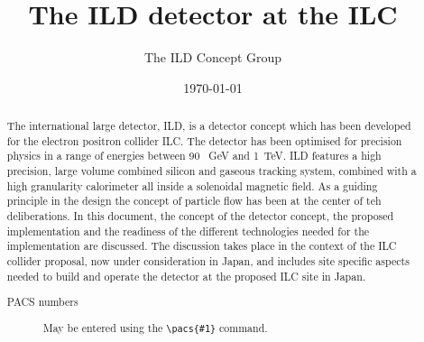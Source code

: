 \documentclass[%
 amsmath,amssymb,
 aps,
]{revtex4-1}
\begin{document}


\title{The ILD detector at the ILC}%

\author{The ILD Concept Group}




\date{\today}%

\begin{abstract}
The international large detector, ILD, is a detector concept which has been developed for the electron positron collider ILC. The detector has been optimised for precision physics in a range of energies between 90 ~GeV and 1~TeV. ILD features a high precision, large volume combined silicon and gaseous tracking system, combined with a high granularity calorimeter all inside a solenoidal magnetic field. As a guiding principle in the design the concept of particle flow has been at the center of teh deliberations. In this document, the concept of the detector concept, the proposed implementation and the readiness of the different technologies needed for the implementation are discussed. The discussion takes place in the context of the ILC collider proposal, now under consideration in Japan, and includes site specific aspects needed to build and operate the detector at the proposed ILC site in Japan. 
\begin{description}
\item[PACS numbers]
May be entered using the \verb+\pacs{#1}+ command.
\end{description}
\end{abstract}
\end{document}

